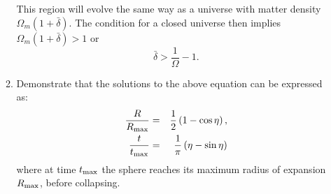 \begin{enumerate}
\begin{enumerate}
\begin{answer}
This region will evolve the same way as a universe with
matter density $\Omega_m(1+\bar\delta)$. The condition for a closed
universe then implies $\Omega_m(1+\bar\delta)>1$ or
\begin{equation}
\bar\delta > \frac{1}{\Omega} -1.
\end{equation}
\end{answer}

\item Demonstrate that the solutions to the above equation can be
expressed as:
\begin{eqnarray}
\label{eq:sphericalcollapse}
\frac{R}{R_{\rm max}} &=& \frac{1}{2}\left(1 - \cos\eta\right), \cr
\frac{t}{t_{\rm max}} &=& \frac{1}{\pi}\left(\eta - \sin\eta\right)
\end{eqnarray}
where at time $t_{\rm max}$ the sphere reaches its maximum radius of
expansion $R_{\rm max}$, before collapsing. 


\end{enumerate}
\end{enumerate}
